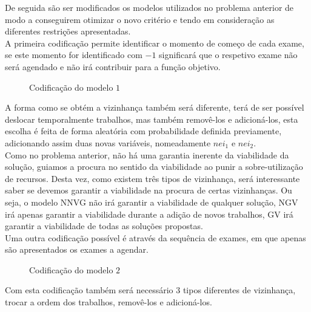 De seguida são ser modificados os modelos utilizados no problema anterior de modo a conseguirem otimizar o novo critério e tendo em consideração as diferentes restrições apresentadas.\\

A primeira codificação permite identificar o momento de começo de cada exame, se este momento for identificado com $-1$ significará que o respetivo exame não será agendado e não irá contribuir para a função objetivo.\\

\begin{figure}[h]
    \centering
    \makebox[\textwidth][c]{%
        \texttt{[image: P2M1]}
    }
    \caption{Codificação do modelo $1$}
    \label{fig:cod_prob2_mod1}
\end{figure}

A forma como se obtém a vizinhança também será diferente, terá de ser possível deslocar temporalmente trabalhos, mas também removê-los e adicioná-los, esta escolha é feita de forma aleatória com probabilidade definida previamente, adicionando assim duas novas variáveis, nomeadamente $nei_1$ e $nei_2$.\\

Como no problema anterior, não há uma garantia inerente da viabilidade da solução, guiamos a procura no sentido da viabilidade ao punir a sobre-utilização de recursos. Desta vez, como existem três tipos de vizinhança, será interessante saber se devemos garantir a viabilidade na procura de certas vizinhanças. Ou seja, o modelo NNVG não irá garantir a viabilidade de qualquer solução, NGV irá apenas garantir a viabilidade durante a adição de novos trabalhos, GV irá garantir a viabilidade de todas as soluções propostas.\\

Uma outra codificação possível é através da sequência de exames, em que apenas são apresentados os exames a agendar.\\

\begin{figure}[h]
    \centering
    \makebox[\textwidth][c]{%
        \texttt{[image: P2M2]}
    }
    \caption{Codificação do modelo $2$}
    \label{fig:cod_prob2_mod2}
\end{figure}

Com esta codificação também será necessário 3 tipos diferentes de vizinhança, trocar a ordem dos trabalhos, removê-los e adicioná-los.\\

